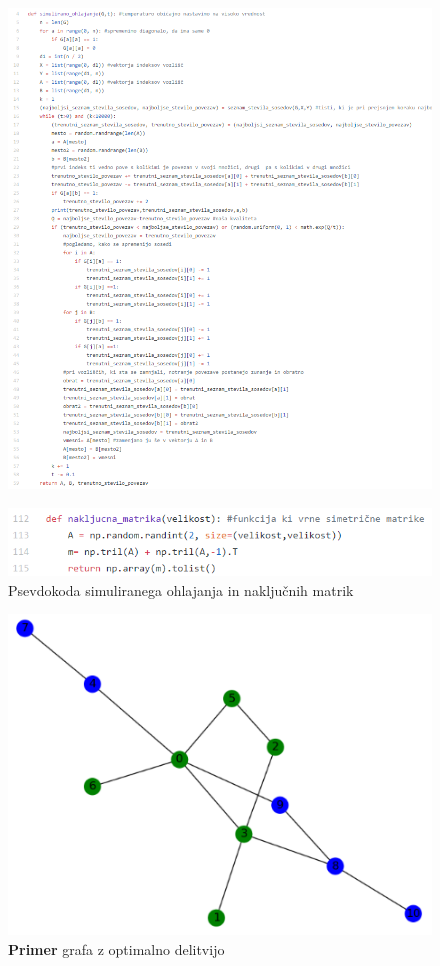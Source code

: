 \documentclass[12pt,a4paper]{amsart}
\theoremstyle{definition} %
\theoremstyle{plain} %
\begin{document}
\FloatBarrier
\begin{figure}
  \centering
  \includegraphics{simulirano}
\end{figure}
\FloatBarrier

\FloatBarrier
\begin{figure}
  \centering
  \includegraphics{matrike}
  \caption{Psevdokoda simuliranega ohlajanja in naključnih matrik}
\end{figure}


\begin{figure}
  \centering
  \includegraphics{primer_grafa}
 \caption{\textbf{Primer} grafa z optimalno delitvijo}
\end{figure}
\end{document}
